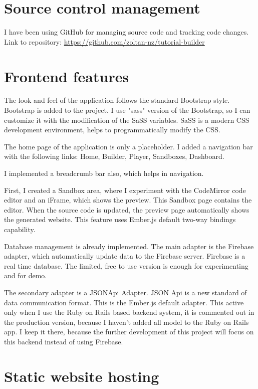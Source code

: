 \documentclass[12pt, a4paper, oneside, openright, medskipamount]{report}
\begin{document}
\section{Source control management}

I have been using GitHub for managing source code and tracking code changes. Link to repository: \url{https://github.com/zoltan-nz/tutorial-builder}

\section{Frontend features}

The look and feel of the application follows the standard Bootstrap style. Bootstrap is added to the project. I use "sass" version of the Bootstrap, so I can customize it with the modification of the SaSS variables. SaSS is a modern CSS development environment, helps to programmatically modify the CSS.

The home page of the application is only a placeholder. I added a navigation bar with the following links: Home, Builder, Player, Sandboxes, Dashboard.

I implemented a breadcrumb bar also, which helps in navigation.

First, I created a Sandbox area, where I experiment with the CodeMirror code editor and an iFrame, which shows the preview. This Sandbox page contains the editor. When the source code is updated, the preview page automatically shows the generated website. This feature uses Ember.js default two-way bindings capability.

Database management is already implemented. The main adapter is the Firebase adapter, which automatically update data to the Firebase server. Firebase is a real time database. The limited, free to use version is enough for experimenting and for demo.

The secondary adapter is a JSONApi Adapter. JSON Api \cite{jsonapi} is a new standard of data communication format. This is the Ember.js default adapter. This active only when I use the Ruby on Rails based backend system, it is commented out in the production version, because I haven't added all model to the Ruby on Rails app. I keep it there, because the further development of this project will focus on this backend instead of using Firebase.

\section{Static website hosting}
\end{document}

